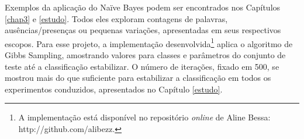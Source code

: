 
Exemplos da aplicação do Naïve Bayes podem ser encontrados nos Capítulos \ref{chap3} e \ref{estudo}. Todos eles exploram contagens de palavras, ausências/presenças ou pequenas variações, apresentadas em seus respectivos escopos. Para esse projeto, a implementação desenvolvida\footnote{A implementação está disponível no repositório \emph{online} de Aline Bessa: http://github.com/alibezz.} aplica o algoritmo de Gibbs Sampling, amostrando valores para classes e parâmetros do conjunto de teste até a classificação estabilizar. O número de iterações, fixado em 500, se mostrou mais do que suficiente para estabilizar a classificação em todos os experimentos conduzidos, apresentados no Capítulo \ref{estudo}. 


